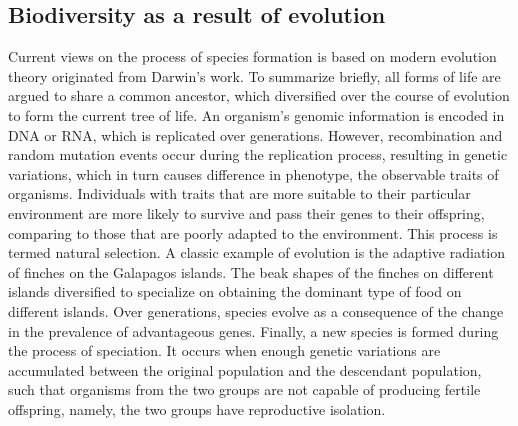 \documentclass[11pt, a4paper,oneside,chapterprefix=false]{scrbook}
\begin{document}
\subsection{Biodiversity as a result of evolution} \label{subsec: one}
\begin{figure}[h]
	\centering
	\hfill
	\label{fig:evolution}
\end{figure}
Current views on the process of species formation is based on modern evolution theory originated from Darwin's work. To summarize briefly, all forms of life are argued to share a common ancestor, which diversified over the course of evolution to form the current tree of life. An organism's genomic information is encoded in DNA or RNA, which is replicated over generations. However, recombination and random mutation events occur during the replication process, resulting in genetic variations, which in turn causes difference in phenotype, the observable traits of organisms. Individuals with traits that are more suitable to their particular environment are more likely to survive and pass their genes to their offspring, comparing to those that are poorly adapted to the environment. This process is termed natural selection. A classic example of evolution is the adaptive radiation of finches on the Galapagos islands. The beak shapes of the finches on different islands diversified to specialize on obtaining the dominant type of food on different islands. Over generations, species evolve as a consequence of the change in the prevalence of advantageous genes. Finally, a new species is formed during the process of speciation. It occurs when enough genetic variations are accumulated between the original population and the descendant population, such that organisms from the two groups are not capable of producing fertile offspring, namely, the two groups have reproductive isolation. \\
\end{document}
